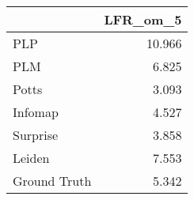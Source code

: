 \begin{tabular}{lr}
\toprule
{} & LFR_om_5 \\
\midrule
PLP          &   10.966 \\
PLM          &    6.825 \\
Potts        &    3.093 \\
Infomap      &    4.527 \\
Surprise     &    3.858 \\
Leiden       &    7.553 \\
Ground Truth &    5.342 \\
\bottomrule
\end{tabular}
